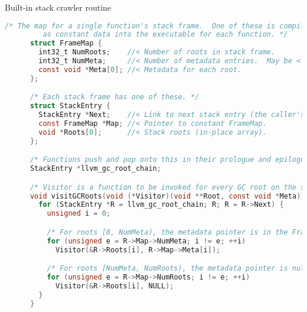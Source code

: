 \documentclass[8pt]{beamer}
\begin{document}
\begin{frame}[fragile]{Built-in stack crawler routine}
  \begin{exampleblock}{}
    \begin{lstlisting}[language=C,basicstyle=\tiny\ttfamily]
      /* The map for a single function's stack frame.  One of these is compiled
         as constant data into the executable for each function. */
      struct FrameMap {
        int32_t NumRoots;    //< Number of roots in stack frame.
        int32_t NumMeta;     //< Number of metadata entries.  May be < NumRoots.
        const void *Meta[0]; //< Metadata for each root.
      };

      /* Each stack frame has one of these. */
      struct StackEntry {
        StackEntry *Next;    //< Link to next stack entry (the caller's).
        const FrameMap *Map; //< Pointer to constant FrameMap.
        void *Roots[0];      //< Stack roots (in-place array).
      };

      /* Functions push and pop onto this in their prologue and epilogue. */
      StackEntry *llvm_gc_root_chain;

      /* Visitor is a function to be invoked for every GC root on the stack. */
      void visitGCRoots(void (*Visitor)(void **Root, const void *Meta)) {
        for (StackEntry *R = llvm_gc_root_chain; R; R = R->Next) {
          unsigned i = 0;

          /* For roots [0, NumMeta), the metadata pointer is in the FrameMap. */
          for (unsigned e = R->Map->NumMeta; i != e; ++i)
            Visitor(&R->Roots[i], R->Map->Meta[i]);

          /* For roots [NumMeta, NumRoots), the metadata pointer is null. */
          for (unsigned e = R->Map->NumRoots; i != e; ++i)
            Visitor(&R->Roots[i], NULL);
        }
      }
    \end{lstlisting}
  \end{exampleblock}
\end{frame}
\end{document}
